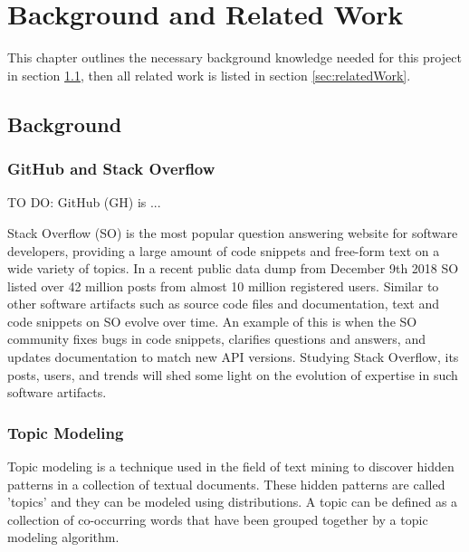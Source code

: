 \chapter{Background and Related Work}
    This chapter outlines the necessary background knowledge needed for this project in section \ref{sec:background}, then all related work is listed in section \ref{sec:relatedWork}.
    
\section{Background} \label{sec:background}
    
    
    \subsection{GitHub and Stack Overflow}
        TO DO: GitHub (GH) is ...
    
        Stack Overflow (SO) is the most popular question answering website for software developers, providing a large amount of code snippets and free-form text on a wide variety of topics. In a recent public data dump from December 9th 2018 SO listed over 42 million posts from almost 10 million registered users. Similar to other software artifacts such as source code files and documentation, text and code snippets on SO evolve over time. An example of this is when the SO community fixes bugs in code snippets, clarifies questions and answers, and updates documentation to match new API versions. Studying Stack Overflow, its posts, users, and trends will shed some light on the evolution of expertise in such software artifacts.
    
    
    \subsection{Topic Modeling}
        
        Topic modeling is a technique used in the field of text mining to discover hidden patterns in a collection of textual documents. These hidden patterns are called 'topics' and they can be modeled using distributions. A topic can be defined as a collection of co-occurring words that have been grouped together by a topic modeling algorithm.
        
